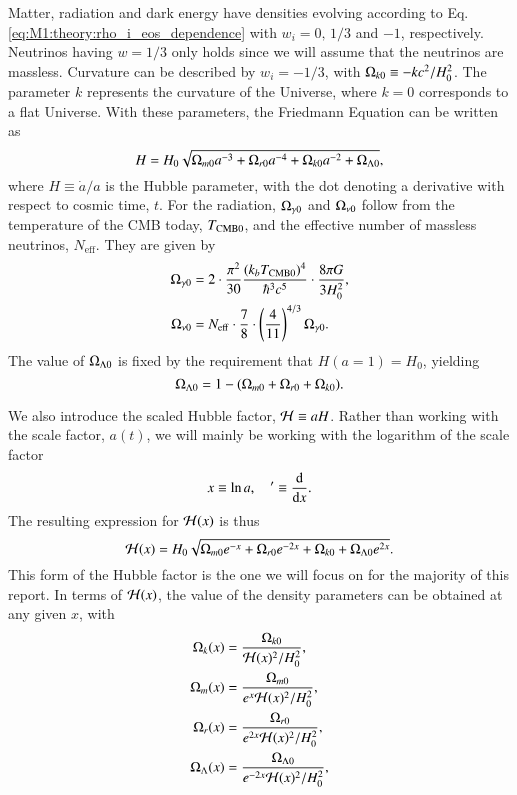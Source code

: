 Matter, radiation and dark energy have densities evolving according to Eq. \eqref{eq:M1:theory:rho_i_eos_dependence} with $w_i=0,\,1/3$ and $-1$, respectively. Neutrinos having $w=1/3$ only holds since we will assume that the neutrinos are massless. Curvature can be described by $w_i=-1/3$, with $\Omega_{k0}\equiv -kc^2/H_0^2$. The parameter $k$ represents the curvature of the Universe, where $k=0$ corresponds to a flat Universe. With these parameters, the Friedmann Equation can be written as \cite[Eq. (3.14)]{Dodelson}  
\begin{equation}
    H = H_0 \sqrt{\Omega_{m0} a^{-3} + \Omega_{r0} a^{-4} + \Omega_{k0} a^{-2} + \Omega_{\Lambda 0}}, \label{eq:M1:theory:Friedmann_H_omegas}
\end{equation}
where $H\equiv\dot{a}/a$ is the Hubble parameter, with the dot denoting a derivative with respect to cosmic time, $t$. For the radiation, $\Omega_{\gamma 0}$ and $\Omega_{\nu 0}$ follow from the temperature of the CMB today, $T_\mathrm{CMB0}$, and the effective number of massless neutrinos, $N_\mathrm{eff}$. They are given by 
\begin{align}
    \Omega_{\gamma 0} &= 2 \cdot \frac{\pi^2}{30} \frac{(k_b T_\mathrm{CMB0})^4}{\hbar^3 c^5} \cdot \frac{8\pi G}{3H_0^2}, \label{eq:M1:theory:omega_gamma0_T} \\
    \Omega_{\nu 0} &= N_\mathrm{eff} \cdot \frac{7}{8} \cdot \left( \frac{4}{11} \right)^{4/3} \Omega_{\gamma 0}. \label{eq:M1:theory:omega_nu0_T}
\end{align}
%
%
The value of $\Omega_{\Lambda 0}$ is fixed by the requirement that $H(a=1)=H_0$, yielding 
\begin{equation}
    \Omega_{\Lambda 0} = 1 - (\Omega_{m0} + \Omega_{r0} + \Omega_{k0}). \label{eq:M1:theory:omega_lambda_0_normalization_condition}
\end{equation}
%

We also introduce the scaled Hubble factor, $\mathcal{H}\equiv aH$. Rather than working with the scale factor, $a(t)$, we will mainly be working with the logarithm of the scale factor 
\begin{equation} \label{eq:M1:theory:x_dx_definitions}
    x\equiv \ln a,\quad '\equiv \dv{x}. 
\end{equation}
%
The resulting expression for $\mathcal{H}(x)$ is thus  
\begin{equation} \label{eq:M1:theory:Hp_of_x}
    \mathcal{H}(x) = H_0 \sqrt{\Omega_{m0} e^{-x} + \Omega_{r0} e^{-2x} + \Omega_{k0} + \Omega_{\Lambda 0} e^{2x}}. 
\end{equation}
%
This form of the Hubble factor is the one we will focus on for the majority of this report. In terms of $\mathcal{H}(x)$, the value of the density parameters can be obtained at any given $x$, with 
\begin{align}
    \Omega_{k}(x) &= \frac{\Omega_{k0}}{\mathcal{H}(x)^2 / H_0^2}, \label{eq:M1:theory:omega_k_of_x}\\ 
    \Omega_{m}(x) &= \frac{\Omega_{m0}}{e^x \mathcal{H}(x)^2 / H_0^2}, \label{eq:M1:theory:omega_m_of_x}\\ 
    \Omega_{r}(x) &= \frac{\Omega_{r0}}{e^{2x} \mathcal{H}(x)^2 / H_0^2}, \label{eq:M1:theory:omega_r_of_x}\\ 
    \Omega_{\Lambda}(x) &= \frac{\Omega_{\Lambda 0}}{e^{-2x} \mathcal{H}(x)^2 / H_0^2}, \label{eq:M1:theory:omega_L_of_x}    
\end{align}

